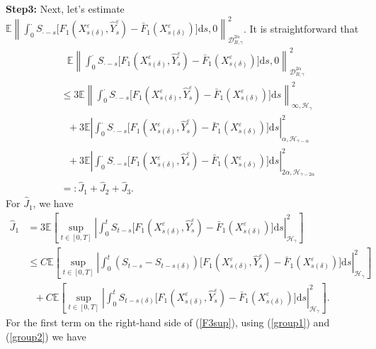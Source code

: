 \documentclass[10pt,a4paper]{article}
\numberwithin{equation}{section}
\begin{document}
\textbf{Step3:} Next, let's estimate $ \mathbb E \left\|\int_0^\cdot S_{\cdot-s} \big[F_1(X_{s(\delta)}^\varepsilon,\hat{Y}_s^\varepsilon)-\bar{F}_1(X_{s(\delta)}^\varepsilon) \big]\mathrm{d} s,0 \right\|_{\mathcal{D}_{B,\gamma}^{2\alpha}}^2$.
It is straightforward that
\begin{align*}%
	&~~~ \mathbb E \left\| \displaystyle\int_0^\cdot S_{\cdot-s} \big[F_1(X_{s(\delta)}^\varepsilon,\hat{Y}_s^\varepsilon)-\bar{F}_1(X_{s(\delta)}^\varepsilon) \big]\mathrm{d} s,0 \right\|_{\mathcal{D}_{B,\gamma}^{2\alpha}}^2 \nonumber\\	
	&\leq  3 \mathbb E \left\| \displaystyle\int_0^\cdot S_{\cdot-s} \big[F_1(X_{s(\delta)}^\varepsilon,\hat{Y}_s^\varepsilon)-\bar{F}_1(X_{s(\delta)}^\varepsilon) \big]\mathrm{d} s \right\|_{\infty,\mathcal H_\gamma}^2 \nonumber\\	
	&~~~+ 3 \mathbb E \left| \displaystyle\int_0^\cdot S_{\cdot-s} \big[F_1(X_{s(\delta)}^\varepsilon,\hat{Y}_s^\varepsilon)-\bar{F}_1(X_{s(\delta)}^\varepsilon) \big]\mathrm{d} s \right|_{\alpha,\mathcal H_{\gamma-\alpha}}^2 \nonumber\\
	&~~~+3  \mathbb E \left| \displaystyle\int_0^\cdot S_{\cdot-s} \big[F_1(X_{s(\delta)}^\varepsilon,\hat{Y}_s^\varepsilon)-\bar{F}_1(X_{s(\delta)}^\varepsilon) \big]\mathrm{d} s \right|_{2\alpha,\mathcal H_{\gamma-2\alpha}}^2 \nonumber\\
	& =:\hat{J}_1+\hat{J}_2+\hat{J}_3.	
\end{align*}
For $\hat{J}_1$, we have
\begin{align}\label{F3sup}
\hat{J}_1 &=3 \mathbb E \left[ \sup_{t \in [0,T]} \left| \int_0^t S_{t-s} \big[ F_1(X_{s(\delta)}^\varepsilon,\hat{Y}_s^\varepsilon)-\bar{F}_1(X_{s(\delta)}^\varepsilon) \big]  \mathrm{d} s \right|_{\mathcal H_\gamma }^2 \right]	 \nonumber\\
& \leq C \mathbb E \left[ \sup_{t \in [0,T]} \left| \int_0^t (S_{t-s}-S_{t-s(\delta)}) \big[ F_1(X_{s(\delta)}^\varepsilon,\hat{Y}_s^\varepsilon)-\bar{F}_1(X_{s(\delta)}^\varepsilon) \big] \mathrm{d} s \right|_{\mathcal H_\gamma }^2 \right]	 \nonumber\\
&~~~+ C\mathbb E \left[ \sup_{t \in [0,T]} \left| \int_0^t S_{t-s(\delta)} \big[ F_1(X_{s(\delta)}^\varepsilon,\hat{Y}_s^\varepsilon)-\bar{F}_1(X_{s(\delta)}^\varepsilon) \big]  \mathrm{d} s  \right|_{\mathcal H_\gamma }^2 \right].
\end{align}
For the first term on the right-hand side of (\ref{F3sup}), using (\ref{group1}) and (\ref{group2}) we have
\end{document}
